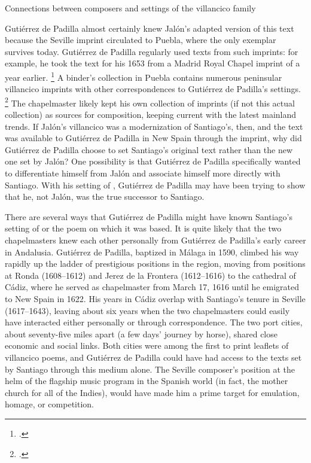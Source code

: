 {Connections between composers and settings of the  villancico
family}

Gutiérrez de Padilla almost certainly knew Jalón's adapted version of this text
because the Seville imprint circulated to Puebla, where the only exemplar
survives today.
Gutiérrez de Padilla regularly used texts from such imprints: for example, he
took the text for his 1653  from a Madrid Royal
Chapel imprint of a year earlier.%
    \footnote{.}
A binder's collection in Puebla contains numerous peninsular villancico imprints
with other correspondences to Gutiérrez de Padilla's settings.%
    \footnote{.}
The chapelmaster likely kept his own collection of imprints (if not this actual
collection) as sources for composition, keeping current with the latest mainland
trends.
If Jalón's villancico was a modernization of Santiago's, then, and the text was
available to Gutiérrez de Padilla in New Spain through the imprint, why did
Gutiérrez de Padilla choose to set Santiago's original text rather than the new
one set by Jalón?
One possibility is that Gutiérrez de Padilla specifically wanted to
differentiate himself from Jalón and associate himself more directly with
Santiago.
With his setting of , Gutiérrez de Padilla may
have been trying to show that he, not Jalón, was the true successor to Santiago.

There are several ways that Gutiérrez de Padilla might have known Santiago's
setting of  or the poem on which it was based.
It is quite likely that the two chapelmasters knew each other personally from
Gutiérrez de Padilla's early career in Andalusia.
Gutiérrez de Padilla, baptized in Málaga in 1590, climbed his way rapidly up the
ladder of prestigious positions in the region, moving from positions at Ronda
(1608--1612)
and Jerez de la Frontera (1612--1616) to the cathedral of Cádiz, where he served
as chapelmaster from March 17, 1616 until he emigrated to New Spain in 1622.%
    \Autocite{Gembero:Padilla}
His years in Cádiz overlap with Santiago's tenure in Seville (1617--1643),
leaving about six years when the two chapelmasters could easily have interacted
either personally or through correspondence.
The two port cities, about seventy-five miles apart (a few days' journey by
horse), shared close economic and social links.
Both cities were among the first to print leaflets of villancico poems, and
Gutiérrez de Padilla could have had access to the texts set by Santiago through
this medium alone.%
    \Autocite
    [ and \emph{Sevilla}]
    {BNE:VCs17C}
The Seville composer's position at the helm of the flagship music
program in the Spanish world (in fact, the mother church for all of the Indies),
would have made him a prime target for emulation, homage, or competition.


